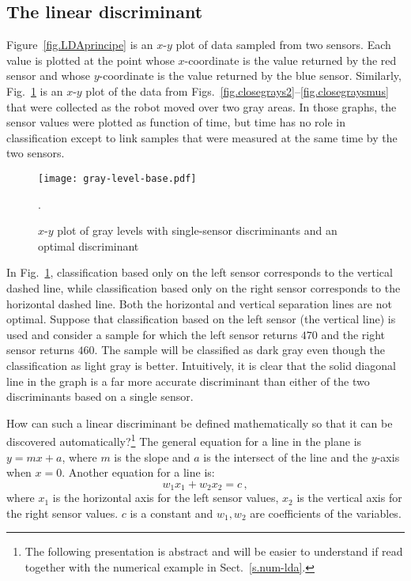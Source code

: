 \subsection{The linear discriminant}
Figure~\ref{fig.LDAprincipe} is an $x$-$y$ plot of data sampled from two sensors. Each value is plotted at the point whose $x$-coordinate is the value returned by the red sensor and whose $y$-coordinate is the value returned by the blue sensor. Similarly, Fig.~\ref{fig.gray-x-y} is an $x$-$y$ plot of the data from Figs.~\ref{fig.closegrays2}--\ref{fig.closegraysmus} that were collected as the robot moved over two gray areas.  In those graphs, the sensor values were plotted as function of time, but time has no role in classification except to link samples that were measured at the same time by the two sensors.

\begin{figure}
\begin{center}
\texttt{[image: gray-level-base.pdf]}
\end{center}
\caption{$x$-$y$ plot of gray levels with single-sensor discriminants and an optimal discriminant}\label{fig.gray-x-y}.
\end{figure}

In Fig.~\ref{fig.gray-x-y}, classification based only on the left sensor corresponds to the vertical dashed line, while classification based only on the right sensor corresponds to the horizontal dashed line. Both the horizontal and vertical separation lines are not optimal. Suppose that classification based on the left sensor (the vertical line) is used and consider a sample for which the left sensor returns $470$ and the right sensor returns $460$. The sample will be classified as dark gray even though the classification as light gray is better. Intuitively, it is clear that the solid diagonal line in the graph is a far more accurate discriminant than either of the two discriminants based on a single sensor.

How can such a linear discriminant be defined mathematically so that it can be discovered automatically?\footnote{The following presentation is abstract and will be easier to understand if read together with the numerical example in Sect.~\ref{s.num-lda}.} The general equation for a line in the plane is $y=mx+a$, where $m$ is the slope and $a$ is the intersect of the line and the $y$-axis when $x=0$. Another equation for a line is:
\begin{equation}
w_1x_1 + w_2x_2 = c\,,\label{eq.diseq}
\end{equation}
where $x_1$ is the horizontal axis for the left sensor values, $x_2$ is the vertical axis for the right sensor values. $c$ is a constant and $w_1,w_2$ are coefficients of the variables.

